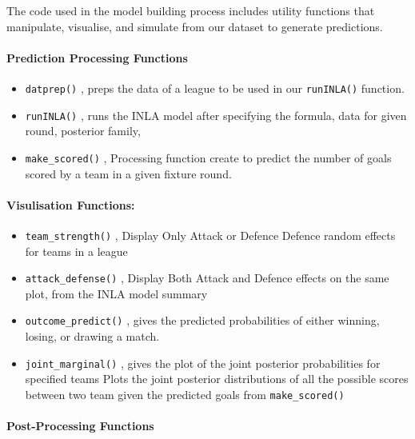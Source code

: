 \documentclass[
]{article}
\begin{document}
The code used in the model building process includes utility functions
that manipulate, visualise, and simulate from our dataset to generate
predictions.

\hypertarget{prediction-processing-functions}{%
\paragraph{Prediction Processing
Functions}\label{prediction-processing-functions}}

\begin{itemize}
\item
  \texttt{datprep()} , preps the data of a league to be used in our
  \texttt{runINLA()} function.
\item
  \texttt{runINLA()} , runs the INLA model after specifying the formula,
  data for given round, posterior family,
\item
  \texttt{make\_scored()} , Processing function create to predict the
  number of goals scored by a team in a given fixture round.
\end{itemize}

\hypertarget{visulisation-functions}{%
\paragraph{Visulisation Functions:}\label{visulisation-functions}}

\begin{itemize}
\item
  \texttt{team\_strength()} , Display Only Attack or Defence Defence
  random effects for teams in a league
\item
  \texttt{attack\_defense()} , Display Both Attack and Defence effects
  on the same plot, from the INLA model summary
\item
  \texttt{outcome\_predict()} , gives the predicted probabilities of
  either winning, losing, or drawing a match.
\item
  \texttt{joint\_marginal()} , gives the plot of the joint posterior
  probabilities for specified teams Plots the joint posterior
  distributions of all the possible scores between two team given the
  predicted goals from \texttt{make\_scored()}
\end{itemize}

\hypertarget{post-processing-functions}{%
\paragraph{Post-Processing Functions}\label{post-processing-functions}}
\end{document}
